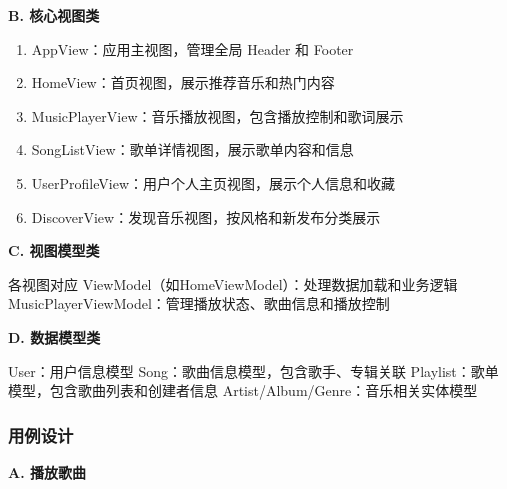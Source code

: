 \documentclass{base}
\begin{document}
\textbf{B. 核心视图类}

\begin{enumerate}
    \item AppView：应用主视图，管理全局 Header 和 Footer
    \item HomeView：首页视图，展示推荐音乐和热门内容
    \item MusicPlayerView：音乐播放视图，包含播放控制和歌词展示
    \item SongListView：歌单详情视图，展示歌单内容和信息
    \item UserProfileView：用户个人主页视图，展示个人信息和收藏
    \item DiscoverView：发现音乐视图，按风格和新发布分类展示
\end{enumerate}

\textbf{C. 视图模型类}

各视图对应 ViewModel（如HomeViewModel）：处理数据加载和业务逻辑
MusicPlayerViewModel：管理播放状态、歌曲信息和播放控制

\textbf{D. 数据模型类}

User：用户信息模型
Song：歌曲信息模型，包含歌手、专辑关联
Playlist：歌单模型，包含歌曲列表和创建者信息
Artist/Album/Genre：音乐相关实体模型

\subsubsection{用例设计}

\textbf{A. 播放歌曲}
\end{document}
